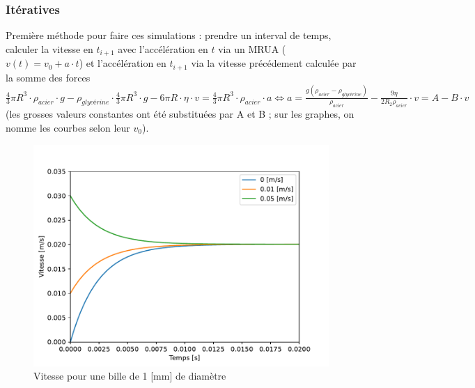 \subsubsection{Itératives}
Première méthode pour faire ces simulations : prendre un interval de temps, calculer la vitesse en
$t_{i+1}$ avec l'accélération en $t$ via un MRUA ($v(t) = v_{0} + a \cdot t $) et l'accélération
en $t_{i+1}$ via la vitesse précédement calculée par la somme des forces
$\frac{4}{3}\pi R^{3} \cdot \rho_{acier} \cdot g - \rho_{glycérine} \cdot \frac{4}{3}\pi R^{3}
\cdot g - 6 \pi R \cdot \eta \cdot v =  \frac{4}{3}\pi R^{3} \cdot \rho_{acier} \cdot a \Longleftrightarrow a =
\frac{g (\rho_{acier}-\rho_{glycérine})}{\rho_{acier}} - \frac{9 \eta }{2 R_{2} \rho_{acier}}\cdot v
= A - B \cdot v $ (les grosses valeurs constantes ont été substituées par A et B ; sur les graphes,
on nomme les courbes selon leur $v_{0}$).
\begin{minipage}{0.475\textwidth}
    \begin{figure}[H]
        \centering
        \includegraphics[scale=0.55]{graph/ray1_it}
        \caption{Vitesse pour une bille de 1 [mm] de diamètre}
        \label{fig:ray1_it}
    \end{figure}
\end{minipage}
\begin{minipage}{0.05\textwidth}
\end{minipage}
